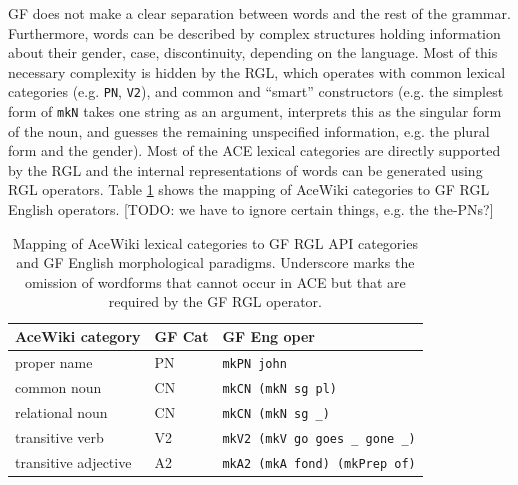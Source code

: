 \documentclass[a4paper]{article}
\def\xp#1{\texttt{#1}}
\begin{document}
GF does not make a clear separation between words and the rest of the grammar.
Furthermore, words can be described by complex structures holding information
about their gender, case, discontinuity, depending on the language. Most of
this necessary complexity is hidden by the RGL, which operates with common
lexical categories (e.g. \texttt{PN}, \texttt{V2}), and common and ``smart''
constructors (e.g. the simplest form of \texttt{mkN} takes one string as an
argument,
interprets this as the singular form of the noun, and guesses the remaining
unspecified information, e.g. the plural form and the gender).
Most of the ACE lexical categories are directly supported by the RGL and the
internal representations of words can be generated using RGL operators.
Table \ref{mapping_acewiki_to_gf} shows the mapping of AceWiki categories
to GF RGL English operators.
[TODO: we have to ignore certain things, e.g.  the the-PNs?]

\begin{table}
\begin{center}
\begin{tabular}{ l l l }
\hline
AceWiki category & GF Cat & GF Eng oper \\
\hline
proper name & PN & \xp{mkPN john} \\
common noun & CN & \xp{mkCN (mkN sg pl)} \\
relational noun & CN & \xp{mkCN (mkN sg \_)} \\
transitive verb & V2 & \xp{mkV2 (mkV go goes \_ gone \_)} \\
transitive adjective & A2 & \xp{mkA2 (mkA fond) (mkPrep of)} \\
\hline
\end{tabular}
\end{center}
\caption{Mapping of AceWiki lexical categories
to GF RGL API categories and GF English
morphological paradigms. Underscore marks the omission of wordforms that
cannot occur in ACE but that are required by the GF RGL
operator.\protect\label{mapping_acewiki_to_gf}}
\end{table}

%
%
\end{document}
